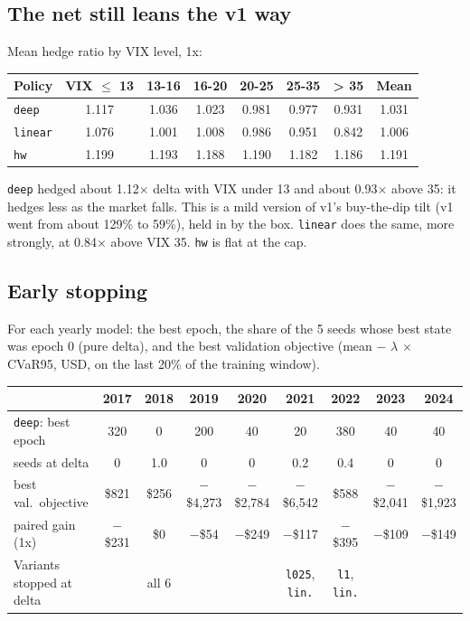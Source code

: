 \documentclass{article}
\begin{document}
\subsection{The net still leans the v1 way}

Mean hedge ratio by VIX level, 1x:

\begin{center}\small
\begin{tabular}{lccccccc}
\toprule
\textbf{Policy} & \textbf{VIX \ensuremath{\leq} 13} & \textbf{13-16} & \textbf{16-20} & \textbf{20-25} & \textbf{25-35} & \textbf{> 35} & \textbf{Mean} \\
\midrule
\texttt{deep} & 1.117 & 1.036 & 1.023 & 0.981 & 0.977 & 0.931 & 1.031 \\
\texttt{linear} & 1.076 & 1.001 & 1.008 & 0.986 & 0.951 & 0.842 & 1.006 \\
\texttt{hw} & 1.199 & 1.193 & 1.188 & 1.190 & 1.182 & 1.186 & 1.191 \\
\bottomrule
\end{tabular}
\end{center}

\texttt{deep} hedged about 1.12\ensuremath{\times} delta with VIX under 13 and about 0.93\ensuremath{\times} above 35: it hedges less as the market falls. This is a mild version of v1's buy-the-dip tilt (v1 went from about 129\% to 59\%), held in by the box. \texttt{linear} does the same, more strongly, at 0.84\ensuremath{\times} above VIX 35. \texttt{hw} is flat at the cap.

\subsection{Early stopping}

For each yearly model: the best epoch, the share of the 5 seeds whose best state was epoch 0 (pure delta), and the best validation objective (mean $-$ \ensuremath{\lambda} \ensuremath{\times} CVaR95, USD, on the last 20\% of the training window).

\begin{center}\footnotesize\setlength{\tabcolsep}{4pt}
\begin{tabular}{lcccccccc}
\toprule
 & \textbf{2017} & \textbf{2018} & \textbf{2019} & \textbf{2020} & \textbf{2021} & \textbf{2022} & \textbf{2023} & \textbf{2024} \\
\midrule
\texttt{deep}: best epoch & 320 & 0 & 200 & 40 & 20 & 380 & 40 & 40 \\
\quad seeds at delta & 0 & 1.0 & 0 & 0 & 0.2 & 0.4 & 0 & 0 \\
\quad best val.\ objective & \$821 & \$256 & $-$\$4,273 & $-$\$2,784 & $-$\$6,542 & \$588 & $-$\$2,041 & $-$\$1,923 \\
\quad paired gain (1x) & $-$\$231 & \$0 & $-$\$54 & $-$\$249 & $-$\$117 & $-$\$395 & $-$\$109 & $-$\$149 \\
\midrule
Variants stopped at delta & & all 6 & & & \texttt{l025}, \texttt{lin.} & \texttt{l1}, \texttt{lin.} & & \\
\bottomrule
\end{tabular}
\end{center}
\end{document}
